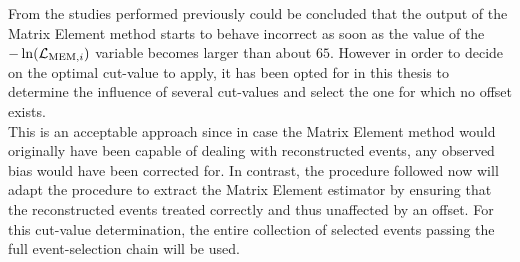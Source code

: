 From the studies performed previously could be concluded that the output of the Matrix Element method starts to behave incorrect as soon as the value of the $-\ln(\mathcal{L}_{\textrm{MEM}, i})$ variable becomes larger than about $65$.
However in order to decide on the optimal cut-value to apply, it has been opted for in this thesis to determine the influence of several cut-values and select the one for which no offset exists.
\\
This is an acceptable approach since in case the Matrix Element method would originally have been capable of dealing with reconstructed events, any observed bias would have been corrected for.
In contrast, the procedure followed now will adapt the procedure to extract the Matrix Element estimator by ensuring that the reconstructed events treated correctly and thus unaffected by an offset.
For this cut-value determination, the entire collection of selected events passing the full event-selection chain will be used.
\\

